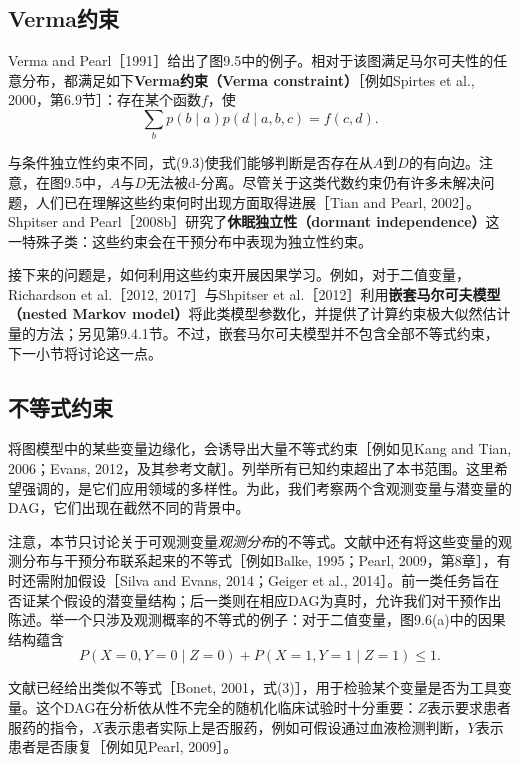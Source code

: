 \subsection{Verma约束}
Verma and Pearl［1991］给出了图9.5中的例子。相对于该图满足马尔可夫性的任意分布，都满足如下\textbf{Verma约束（Verma constraint）}［例如Spirtes et al., 2000，第6.9节］：存在某个函数$f$，使
\begin{equation}
 \sum_b p(b\mid a)p(d\mid a,b,c)=f(c,d).
 \tag{9.3}
\end{equation}


与条件独立性约束不同，式(9.3)使我们能够判断是否存在从$A$到$D$的有向边。注意，在图9.5中，$A$与$D$无法被d-分离。尽管关于这类代数约束仍有许多未解决问题，人们已在理解这些约束何时出现方面取得进展［Tian and Pearl, 2002］。Shpitser and Pearl［2008b］研究了\textbf{休眠独立性（dormant independence）}这一特殊子类：这些约束会在干预分布中表现为独立性约束。

接下来的问题是，如何利用这些约束开展因果学习。例如，对于二值变量，Richardson et al.［2012, 2017］与Shpitser et al.［2012］利用\textbf{嵌套马尔可夫模型（nested Markov model）}将此类模型参数化，并提供了计算约束极大似然估计量的方法；另见第9.4.1节。不过，嵌套马尔可夫模型并不包含全部不等式约束，下一小节将讨论这一点。

\subsection{不等式约束}
将图模型中的某些变量边缘化，会诱导出大量不等式约束［例如见Kang and Tian, 2006；Evans, 2012，及其参考文献］。列举所有已知约束超出了本书范围。这里希望强调的，是它们应用领域的多样性。为此，我们考察两个含观测变量与潜变量的DAG，它们出现在截然不同的背景中。


注意，本节只讨论关于可观测变量\emph{观测分布}的不等式。文献中还有将这些变量的观测分布与干预分布联系起来的不等式［例如Balke, 1995；Pearl, 2009，第8章］，有时还需附加假设［Silva and Evans, 2014；Geiger et al., 2014］。前一类任务旨在否证某个假设的潜变量结构；后一类则在相应DAG为真时，允许我们对干预作出陈述。举一个只涉及观测概率的不等式的例子：对于二值变量，图9.6(a)中的因果结构蕴含
\begin{equation}
 P(X=0,Y=0\mid Z=0)+P(X=1,Y=1\mid Z=1)\le1.
 \tag{9.4}
\end{equation}

文献已经给出类似不等式［Bonet, 2001，式(3)］，用于检验某个变量是否为工具变量。这个DAG在分析依从性不完全的随机化临床试验时十分重要：$Z$表示要求患者服药的指令，$X$表示患者实际上是否服药，例如可假设通过血液检测判断，$Y$表示患者是否康复［例如见Pearl, 2009］。

